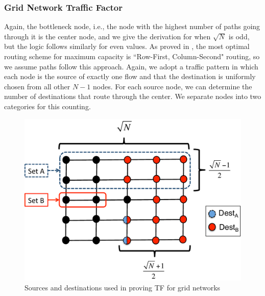 \subsubsection{Grid Network Traffic Factor}

Again, the bottleneck node, i.e., the node with the highest number of paths going through it is the center node, and we give the derivation for when $\sqrt{N}$ is odd, but the logic follows similarly for even values.  As proved in \cite{lattice_nets_cap_opt_routing}, the most optimal routing scheme for maximum capacity is ``Row-First, Column-Second" routing, so we assume paths follow this approach.  Again, we adopt a traffic pattern in which each node is the source of exactly one flow and that the destination is uniformly chosen from all other $N-1$ nodes.  
For each source node, we can determine the number of destinations that route through the center.  We separate nodes into two categories for this counting.

\begin{figure}
\begin{centering}
    \includegraphics[scale=0.39]{figures/TF_proof_fig_color.pdf}
    \caption{Sources and destinations used in proving TF for grid networks}
    \label{fig:TF_proof_fig}
\end{centering}
\end{figure}

